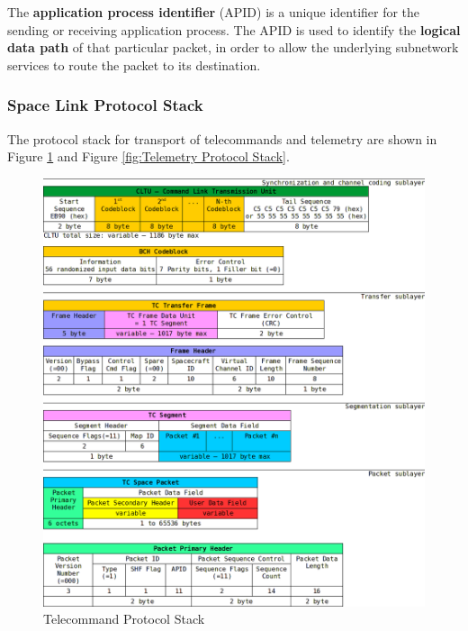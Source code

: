 The \textbf{application process identifier} (APID) is a unique identifier for the sending or receiving application process. The APID is used to identify the \textbf{logical data path} of that particular packet, in order to allow the underlying subnetwork services to route the packet to its destination. 

\subsubsection{Space Link Protocol Stack}

The protocol stack for transport of telecommands and telemetry are shown in Figure \ref{fig:Telecommand Protocol Stack} and Figure \ref{fig:Telemetry Protocol Stack}.

\begin{figure}[h]
\centering\includegraphics[scale=0.4]{fig/telecommand_protocol_stack}
\caption{Telecommand Protocol Stack}
\label{fig:Telecommand Protocol Stack}
\end{figure}

